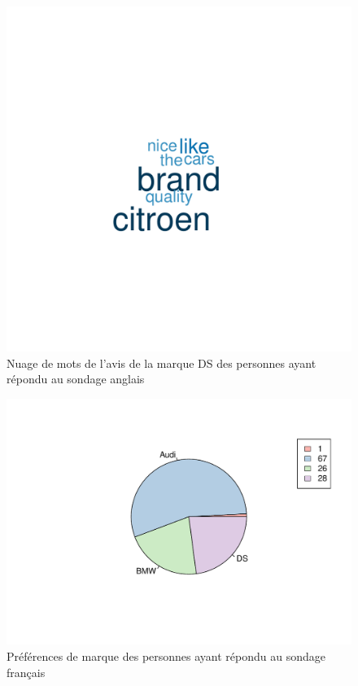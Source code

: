 \documentclass[12pt]{article}\usepackage[]{graphicx}\usepackage[]{color}
\makeatletter
\def\maxwidth{ %
  \ifdim\Gin@nat@width>\linewidth
    \linewidth
  \else
    \Gin@nat@width
  \fi
}
\newenvironment{knitrout}{}{} %
\makeatother
\begin{document}
\begin{knitrout}
\color{fgcolor}\begin{figure}[H]
\includegraphics[width=\maxwidth]{figure/brand_en-1} \caption[Nuage de mots de l'avis de la marque DS des personnes ayant répondu au sondage anglais]{Nuage de mots de l'avis de la marque DS des personnes ayant répondu au sondage anglais}\label{fig:brand en}
\end{figure}


\end{knitrout}

\begin{knitrout}
\color{fgcolor}\begin{figure}[H]
\includegraphics[width=\maxwidth]{figure/preference_fr-1} \caption[Préférences de marque des personnes ayant répondu au sondage français]{Préférences de marque des personnes ayant répondu au sondage français}\label{fig:preference fr}
\end{figure}


\end{knitrout}
\end{document}
